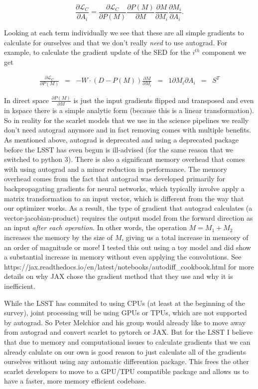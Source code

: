 \documentclass[DM,authoryear,toc]{lsstdoc}
\begin{document}
\begin{equation}
  \frac{\partial\mathcal{L}_C}{\partial A_i} = \frac{\partial\mathcal{L}_C}{\partial P(M)} \frac{\partial P(M)}{\partial M} \frac{\partial M}{\partial M_i} \frac{\partial M_i}{\partial A_i}. \label{eq:full_grad}
\end{equation}

Looking at each term individually we see that these are all simple gradients to calculate for ourselves and that we don't really \emph{need} to use autograd. For example, to calculate the gradient update of the SED for the $i^{th}$ component we get

\begin{align}
  \frac{\partial\mathcal{L}_C}{\partial P(M)} &=& -W\cdot(D-P(M)) \label{eq:grad_logL}
  \frac{\partial M}{\partial M_i} &=& 1 \label{eq:grad_M}
  {\partial M_i}{\partial A_i} &=& S^T \label{eq:grad_Ai}
\end{align}

In direct space $\frac{\partial P(M)}{\partial M}$ is just the input gradients flipped and transposed and even in kspace there is a simple analytic form (because this is a linear transformation). So in reality for the scarlet models that we use in the science pipelines we really don't need autograd anymore and in fact removing comes with multiple benefits. As mentioned above, autograd is deprecated and using a deprecated package before the LSST has even begun is ill-advised (for the same reason that we switched to python 3). There is also a significant memory overhead that comes with using autograd and a minor reduction in performance. The memory overhead comes from the fact that autograd was developed primarily for backpropagating gradients for neural networks, which typically involve apply a matrix transformation to an input vector, which is different from the way that our optimizer works. As a result, the type of gradient that autograd calculates (a vector-jacobian-product) requires the output model from the forward direction as an input \emph{after each operation}. In other words, the operation $M = M_1 + M_2$ increases the memory by the size of $M$, giving us a total increase in memeory of an order of magnitude or more! I tested this out using a toy model and did show a substantial increase in memory without even applying the convolutions. See https://jax.readthedocs.io/en/latest/notebooks/autodiff_cookbook.html for more details on why JAX chose the gradient method that they use and why it is inefficient.

While the LSST has commited to using CPUs (at least at the beginning of the survey), joint processing will be using GPUs or TPUs, which are not supported by autograd. So Peter Melchior and his group would already like to move away from autograd and convert scarlet to pytorch or JAX. But for the LSST I believe that due to memory and computational issues to calculate gradients that we can already calulate on our own is good reason to just calculate all of the gradients ourselves without using any automatic differention package. This frees the other scarlet developers to move to a GPU/TPU compatible package and allows us to have a faster, more memory efficient codebase.
\end{document}
